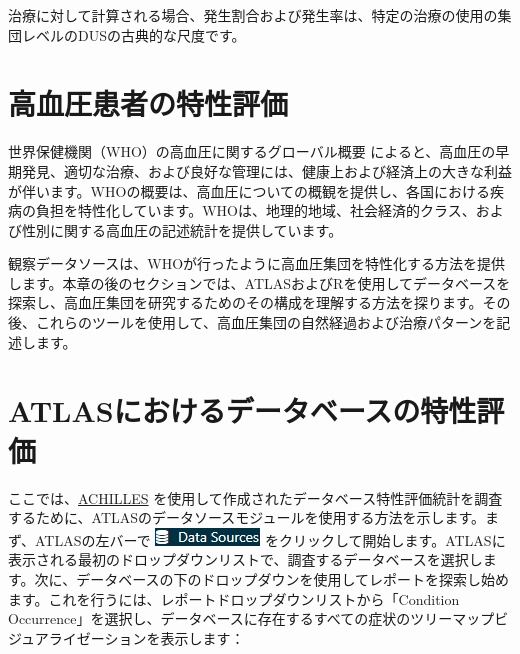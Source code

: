\documentclass[
  11pt]{book}
\theoremstyle{definition}
\theoremstyle{definition}
\theoremstyle{definition}
\theoremstyle{definition}
\theoremstyle{remark}
\begin{document}
治療に対して計算される場合、発生割合および発生率は、特定の治療の使用の集団レベルのDUSの古典的な尺度です。

\section{高血圧患者の特性評価}\label{ux9ad8ux8840ux5727ux60a3ux8005ux306eux7279ux6027ux8a55ux4fa1}

世界保健機関（WHO）の高血圧に関するグローバル概要 \citep[ ]{WHOHypertension} によると、高血圧の早期発見、適切な治療、および良好な管理には、健康上および経済上の大きな利益が伴います。WHOの概要は、高血圧についての概観を提供し、各国における疾病の負担を特性化しています。WHOは、地理的地域、社会経済的クラス、および性別に関する高血圧の記述統計を提供しています。

観察データソースは、WHOが行ったように高血圧集団を特性化する方法を提供します。本章の後のセクションでは、ATLASおよびRを使用してデータベースを探索し、高血圧集団を研究するためのその構成を理解する方法を探ります。その後、これらのツールを使用して、高血圧集団の自然経過および治療パターンを記述します。

\section{ATLASにおけるデータベースの特性評価}\label{atlasux306bux304aux3051ux308bux30c7ux30fcux30bfux30d9ux30fcux30b9ux306eux7279ux6027ux8a55ux4fa1}

ここでは、\href{https://github.com/OHDSI/Achilles}{ACHILLES} を使用して作成されたデータベース特性評価統計を調査するために、ATLASのデータソースモジュールを使用する方法を示します。まず、ATLASの左バーで \includegraphics{images/Characterization/atlasDataSourcesMenuItem.png} をクリックして開始します。ATLASに表示される最初のドロップダウンリストで、調査するデータベースを選択します。次に、データベースの下のドロップダウンを使用してレポートを探索し始めます。これを行うには、レポートドロップダウンリストから「Condition Occurrence」を選択し、データベースに存在するすべての症状のツリーマップビジュアライゼーションを表示します：
\end{document}
